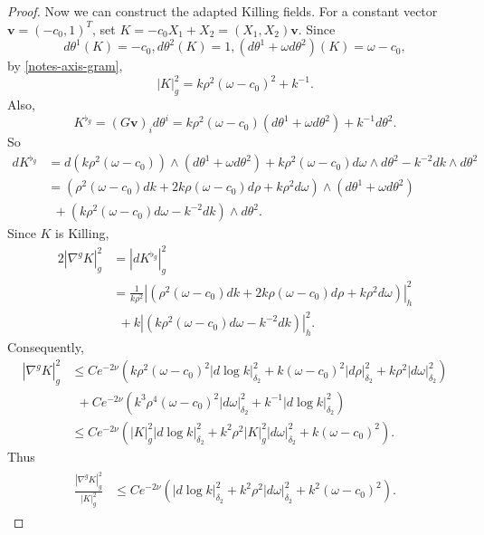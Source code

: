 \documentclass[letterpaper]{amsart}
\theoremstyle{definition}
\theoremstyle{remark}
\begin{document}
\begin{proof}
Now we can construct the adapted Killing fields. For a constant vector $\mathbf{v}=(-c_0,1)^T$, set $K=-c_0X_1+X_2 = (X_1, X_2) \mathbf{v}$. Since 
$$d \theta ^{1}(K) = -c_0, d \theta ^2 (K) = 1, (d \theta ^1 + \omega d \theta ^2)(K) = \omega - c_0,$$ 
by \eqref{notes-axis-gram},
 $$|K|_g^2=k \rho ^2(\omega -c_0)^2+ k ^{-1} .$$
Also,
$$K ^{\flat_g} = (G \mathbf{v})_i d \theta ^{i} = k\rho^2 (\omega - c_0) (d \theta ^{1} + \omega d \theta ^2) + k ^{-1} d \theta ^2 .$$
So
\begin{align*}
dK^{\flat_g}
&=d\left(k\rho^2(\omega-c_0)\right)
       \wedge(d\theta^1+\omega d\theta^2)
       +k\rho^2(\omega-c_0)d\omega\wedge d\theta^2
-k^{-2}dk\wedge d\theta^2\\
   &=\left( \rho^2(\omega-c_0)dk +2k\rho(\omega-c_0)d\rho +k\rho^2 d\omega \right) 
   \wedge(d\theta^1+\omega d\theta^2)\\
&\ \ +\left( k\rho^2(\omega-c_0)d\omega-k^{-2}dk\right) 
\wedge d\theta^2.
\end{align*} 
Since $K$ is Killing, 
\begin{align*}
	2|\nabla ^{g}K|^2_{g} &=  |d K ^{\flat_g}|^2_g \\
			  &= \frac{1}{k \rho ^2}\left| \left( \rho^2(\omega-c_0)dk
+2k\rho(\omega-c_0)d\rho
+k\rho^2 d\omega \right)\right|^2_h \\
			  &\ \ + k \left| \left( 
k\rho^2(\omega-c_0)d\omega-k^{-2}dk\right)\right|^2_h.
\end{align*} 
Consequently,
\begin{align*}
	|\nabla ^{g} K|^2_g &\leq C e ^{- 2 \nu } \left( k\rho ^2(\omega -c_0)^2 |d \log k|^2_{\delta _2} + k (\omega -c_0)^2 |d \rho |^2_{\delta _2} + k \rho ^2 |d \omega |^2_{\delta _2} \right) \\
			    &\ \ + C e ^{- 2 \nu } \left( k^3 \rho ^{4} (\omega -c_0)^2|d \omega |^2_{\delta _2} + k ^{-1} |d \log k|^2_{\delta _2} \right) \\
			    &\leq C e ^{-2 \nu }\left(  |K|^2_g |d \log k|^2_{\delta _2}+ k ^2 \rho ^2 |K|^2_g |d \omega |^2_{\delta _2} + k(\omega -c_0)^2 \right) .
\end{align*} 
Thus
\begin{align}\label{notes-K-ratio}
	\begin{split}
		\frac{|\nabla ^{g}K|_g^2}{|K|_g^2}
		& \leq C e ^{-2 \nu } \left( |d \log k|^2_{\delta _2} + k ^2 \rho ^2 |d \omega |^2_{\delta _2} + k^2(\omega -c_0)^2 \right) .
	\end{split}
\end{align}


\end{proof}
\end{document}
